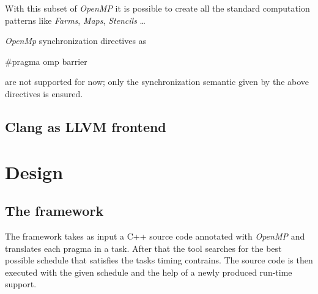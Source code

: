 \documentclass[a4paper,11pt,oneside]{book}
\begin{document}
With this subset of \emph{OpenMP} it is possible to create all the standard computation patterns like \emph{Farms}, \emph{Maps}, \emph{Stencils} \dots 

\emph{OpenMp} synchronization directives as \begin{bf}$\#$pragma omp barrier\end{bf} are not supported for now; only the synchronization semantic given by the above directives is ensured. 






\section{Clang as LLVM frontend}

\chapter{Design}
\section{The framework}

The framework takes as input a C++ source code annotated with \emph{OpenMP} and translates each pragma in a task. After that the tool searches for the best possible schedule that satisfies the tasks timing contrains. The source code is then executed with the given schedule and the help of a newly produced run-time support.
\end{document}
